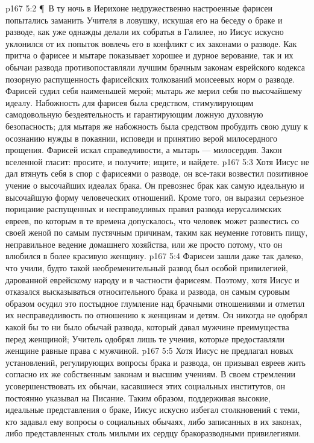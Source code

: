 \vs p167 5:2 \P\ В ту ночь в Иерихоне недружественно настроенные фарисеи попытались заманить Учителя в ловушку, искушая его на беседу о браке и разводе, как уже однажды делали их собратья в Галилее, но Иисус искусно уклонился от их попыток вовлечь его в конфликт с их законами о разводе. Как притча о фарисее и мытаре показывает хорошее и дурное верование, так и их обычаи развода противопоставляли лучшим брачным законам еврейского кодекса позорную распущенность фарисейских толкований моисеевых норм о разводе. Фарисей судил себя наименьшей мерой; мытарь же мерил себя по высочайшему идеалу. Набожность для фарисея была средством, стимулирующим самодовольную бездеятельность и гарантирующим ложную духовную безопасность; для мытаря же набожность была средством пробудить свою душу к осознанию нужды в покаянии, исповеди и принятию верой милосердного прощения. Фарисей искал справедливости, а мытарь --- милосердия. Закон вселенной гласит: просите, и получите; ищите, и найдете.
\vs p167 5:3 Хотя Иисус не дал втянуть себя в спор с фарисеями о разводе, он все\hyp{}таки возвестил позитивное учение о высочайших идеалах брака. Он превознес брак как самую идеальную и высочайшую форму человеческих отношений. Кроме того, он выразил серьезное порицание распущенных и несправедливых правил развода иерусалимских евреев, по которым в те времена допускалось, что человек может развестись со своей женой по самым пустячным причинам, таким как неумение готовить пищу, неправильное ведение домашнего хозяйства, или же просто потому, что он влюбился в более красивую женщину.
\vs p167 5:4 Фарисеи зашли даже так далеко, что учили, будто такой необременительный развод был особой привилегией, дарованной еврейскому народу и в частности фарисеям. Поэтому, хотя Иисус и отказался высказываться относительного брака и развода, он самым суровым образом осудил это постыдное глумление над брачными отношениями и отметил их несправедливость по отношению к женщинам и детям. Он никогда не одобрял какой бы то ни было обычай развода, который давал мужчине преимущества перед женщиной; Учитель одобрял лишь те учения, которые предоставляли женщине равные права с мужчиной.
\vs p167 5:5 Хотя Иисус не предлагал новых установлений, регулирующих вопросы брака и развода, он призывал евреев жить согласно их же собственным законам и высшим учениям. В своем стремлении усовершенствовать их обычаи, касавшиеся этих социальных институтов, он постоянно указывал на Писание. Таким образом, поддерживая высокие, идеальные представления о браке, Иисус искусно избегал столкновений с теми, кто задавал ему вопросы о социальных обычаях, либо записанных в их законах, либо представленных столь милыми их сердцу бракоразводными привилегиями.
